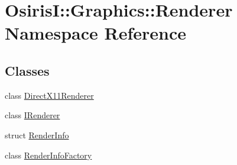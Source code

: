 \hypertarget{namespace_osiris_i_1_1_graphics_1_1_renderer}{\section{Osiris\-I\-:\-:Graphics\-:\-:Renderer Namespace Reference}
\label{namespace_osiris_i_1_1_graphics_1_1_renderer}
}
\subsection*{Classes}
\begin{DoxyCompactItemize}
\item 
class \hyperlink{class_osiris_i_1_1_graphics_1_1_renderer_1_1_direct_x11_renderer}{Direct\-X11\-Renderer}
\item 
class \hyperlink{class_osiris_i_1_1_graphics_1_1_renderer_1_1_i_renderer}{I\-Renderer}
\item 
struct \hyperlink{struct_osiris_i_1_1_graphics_1_1_renderer_1_1_render_info}{Render\-Info}
\item 
class \hyperlink{class_osiris_i_1_1_graphics_1_1_renderer_1_1_render_info_factory}{Render\-Info\-Factory}
\end{DoxyCompactItemize}
